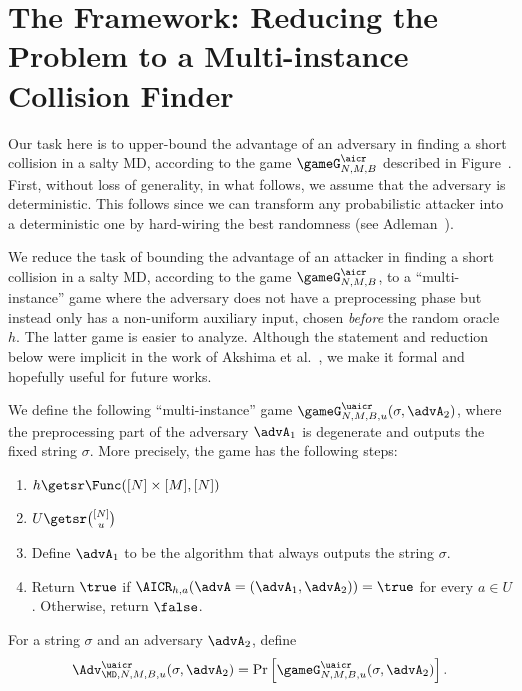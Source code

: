 
\section{The Framework: Reducing the Problem to a Multi-instance Collision Finder}\label{sec:setup}
Our task here is to upper-bound the advantage of an adversary in finding a short collision in a salty MD, according to the game $\gameG^{\aicr}_{N, M, B}$ described in Figure~. 
First, without loss of generality, in what follows, we assume that the adversary is deterministic. This follows since we can transform any probabilistic attacker into a deterministic one by hard-wiring the best randomness (see Adleman~\cite{SFCS:Adleman78}). 

We reduce the task of bounding the advantage of an attacker in finding a short collision in a salty MD, according to the game $\gameG^{\aicr}_{N,M,B}$, to a ``multi-instance'' game where the adversary does not have a preprocessing phase but instead only has a non-uniform auxiliary input, chosen \emph{before} the random oracle~$h$. The latter game is easier to analyze. 
Although the statement and reduction below were implicit in the work of Akshima et al.~\cite{AkshimaCDW20}, we make it formal and hopefully useful for future works. 


We define the following ``multi-instance'' game $\gameG^\uaicr_{N,M,B,u}(\sigma, \advA_2)$, where the preprocessing part of the adversary $\advA_1$ is degenerate and outputs the fixed string $\sigma$. More precisely, the game has the following steps: 
\begin{enumerate}
     \item $h \getsr \Func([N]\times [M], [N])$
    \item $U\getsr \binom{[N]}{u}$
    \item Define $\advA_1$ to be the algorithm that always outputs the string $\sigma$. 
    \item Return $\true$ if $\AICR_{h,a}(\advA = (\advA_1,\advA_2))=\true$ for every $a\in U$. Otherwise, return $\false$.
\end{enumerate}
For a string $\sigma$ and an adversary $\advA_2$, define
\begin{align*}
\Adv^{\uaicr}_{\MD,N,M,B,u} (\sigma, \advA_2)=\Pr\left[ \gameG^\uaicr_{N,M,B,u}(\sigma, \advA_2) \right].
\end{align*}

